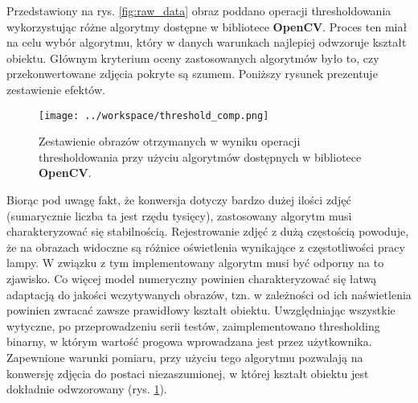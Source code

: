 \documentclass[a4paper,11pt,twoside,openright]{article} %
\begin{document}
\noindent Przedstawiony na rys. \ref{fig:raw_data} obraz poddano operacji thresholdowania wykorzystując różne algorytmy dostępne w bibliotece \textbf{OpenCV}. Proces ten miał na celu wybór algorytmu, który w danych warunkach najlepiej odwzoruje kształt obiektu. Głównym kryterium oceny zastosowanych algorytmów było to, czy przekonwertowane zdjęcia pokryte są szumem. Poniższy rysunek prezentuje zestawienie efektów.

\captionsetup{skip=0pt}
\begin{figure}[!h]
\captionsetup{justification=centering}
\begin{center}
\texttt{[image: ../workspace/threshold\_comp.png]} 
\end{center}
\caption{Zestawienie obrazów otrzymanych w wyniku operacji thresholdowania przy użyciu algorytmów dostępnych w bibliotece \textbf{OpenCV}.}
\label{fig:threshold}
\end{figure} 

\noindent Biorąc pod uwagę fakt, że konwersja dotyczy bardzo dużej ilości zdjęć (sumarycznie liczba ta jest rzędu tysięcy), zastosowany algorytm musi charakteryzować się stabilnością. Rejestrowanie zdjęć z dużą częstością powoduje, że na obrazach widoczne są różnice oświetlenia wynikające z częstotliwości pracy lampy. W związku z tym implementowany algorytm musi być odporny na to zjawisko. Co więcej model numeryczny powinien charakteryzować się łatwą adaptacją do jakości wczytywanych obrazów, tzn. w zależności od ich naświetlenia powinien zwracać zawsze prawidłowy kształt obiektu.
Uwzględniając wszystkie wytyczne, po przeprowadzeniu serii testów, zaimplementowano thresholding binarny, w którym wartość progowa wprowadzana jest przez użytkownika. Zapewnione warunki pomiaru, przy użyciu tego algorytmu pozwalają na konwersję zdjęcia do postaci niezaszumionej, w której kształt obiektu jest dokładnie odwzorowany (rys. \ref{fig:threshold}).

\vspace{10mm}
\end{document}
